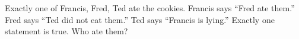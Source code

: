 Exactly one of Francis, Fred, Ted ate the cookies. Francis says ``Fred ate them.'' Fred says ``Ted did not eat them.'' Ted says ``Francis is lying.'' Exactly one statement is true. Who ate them?
